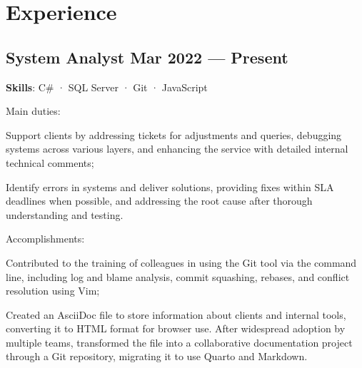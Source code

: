 \section{Experience}

\subsection{System Analyst \hfill Mar 2022 --- Present}
\vspace{.8em}
\textbf{Skills}: C\# · SQL Server · Git · JavaScript


\vspace{.7em}
Main duties:
\vspace{-.5em}
\begin{zitemize}
  \item
    Support clients by addressing tickets for adjustments and queries, debugging systems across various layers, and enhancing the service with detailed internal technical comments;
  \vspace{.1em}
  \item
    Identify errors in systems and deliver solutions, providing fixes within SLA deadlines when possible, and addressing the root cause after thorough understanding and testing.
\end{zitemize}


\vspace{.7em}
Accomplishments:
\vspace{-.5em}
\begin{zitemize}
  \item
    Contributed to the training of colleagues in using the Git tool via the command line, including log and blame analysis, commit squashing, rebases, and conflict resolution using Vim;
  \vspace{.1em}
  \item
    Created an AsciiDoc file to store information about clients and internal tools, converting it to HTML format for browser use. After widespread adoption by multiple teams, transformed the file into a collaborative documentation project through a Git repository, migrating it to use Quarto and Markdown.
\end{zitemize}

